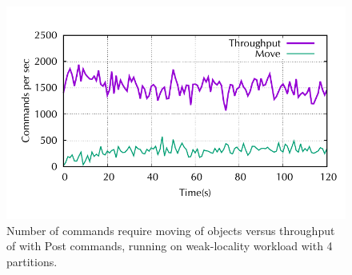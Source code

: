\begin{figure}[ht!]
\begin{minipage}[b]{1\linewidth}
\centering
      \includegraphics[width=0.6\linewidth]{figures/experiments/dssmr/move-vs-throughput-weak}
\end{minipage}
\caption{Number of commands require moving of objects versus throughput of \dssmr{} with Post commands, running on weak-locality workload with 4 partitions.}
\label{fig:dssmr-move-vs-tp-weak}
\end{figure}

